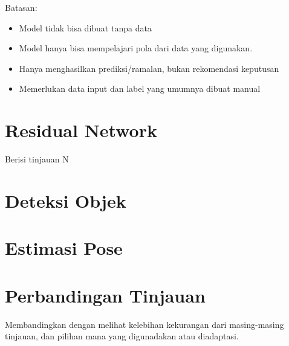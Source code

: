 Batasan:
\begin{itemize}
  \item Model tidak bisa dibuat tanpa data
  \item Model hanya bisa mempelajari pola dari data yang digunakan.
  \item Hanya menghasilkan prediksi/ramalan, bukan rekomendasi keputusan
  \item Memerlukan data input dan label yang umumnya dibuat manual
\end{itemize}

\section{Residual Network \label{sec:2-ResidualNetwork}}
Berisi tinjauan N

\section{Deteksi Objek\label{sec:2-DeteksiObjek}}

\section{Estimasi Pose\label{sec:2-EstimasiPose}}

\section{Perbandingan Tinjauan \label{sec2-Banding}}
Membandingkan dengan melihat kelebihan kekurangan dari masing-masing tinjauan, dan pilihan mana 
yang digunadakan atau diadaptasi.
